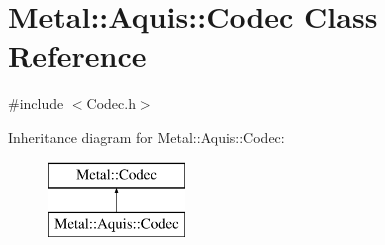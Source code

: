 \hypertarget{classMetal_1_1Aquis_1_1Codec}{}\section{Metal\+:\+:Aquis\+:\+:Codec Class Reference}
\label{classMetal_1_1Aquis_1_1Codec}


{\ttfamily \#include $<$Codec.\+h$>$}

Inheritance diagram for Metal\+:\+:Aquis\+:\+:Codec\+:\begin{figure}[H]
\begin{center}
\leavevmode
\includegraphics[height=2.000000cm]{classMetal_1_1Aquis_1_1Codec}
\end{center}
\end{figure}
